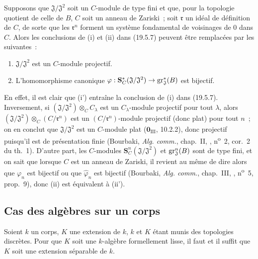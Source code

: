 \begin{remark}[19.5.8]
\label{0.19.5.8-fr}
Supposons que $\mathfrak J/\mathfrak J^2$ soit un $C$-module de type fini et
que, pour la topologie quotient de celle de $B$, $C$ soit un anneau de Zariski~;
soit $\mathfrak r$ un idéal de définition de $C$, de sorte que les
$\mathfrak r^n$ forment un système fondamental de voisinages de $0$ dans $C$.
Alors les conclusions de (i) et (ii) dans (19.5.7) peuvent être remplacées par
les suivantes~:
\begin{enumerate}
  \item[\rm(i')] $\mathfrak J/\mathfrak J^2$ est un $C$-module projectif.
  \item[\rm(ii')] L'homomorphisme canonique
  $\varphi:\mathbf S_C^*(\mathfrak J/\mathfrak J^2)
  \to\operatorname{gr}_{\mathfrak J}^*(B)$ est bijectif.
\end{enumerate}
En effet, il est clair que (i') entraîne la conclusion de (i) dans (19.5.7).
Inversement, si $(\mathfrak J/\mathfrak J^2)\otimes_C C_\lambda$ est un
$C_\lambda$-module projectif pour tout $\lambda$, alors
$(\mathfrak J/\mathfrak J^2)\otimes_C(C/\mathfrak r^n)$ est un
$(C/\mathfrak r^n)$-module projectif (donc plat) pour tout $n$~; on en conclut
que $\mathfrak J/\mathfrak J^2$ est un $C$-module plat
($\mathbf 0_{\mathrm{III}}$, 10.2.2), donc projectif puisqu'il est de
présentation finie (Bourbaki, \emph{Alg. comm.}, chap.~II, ,
n\textsuperscript{o}~2, cor.~2 du th.~1). D'autre part, les $C$-modules
$\mathbf S_C^n(\mathfrak J/\mathfrak J^2)$ et $\operatorname{gr}_{\mathfrak J}^n(B)$ sont
de type fini, et on sait que lorsque $C$ est un anneau de Zariski, il revient
au même de dire alors que $\varphi_n$ est bijectif ou que
$\widehat\varphi_n$ est bijectif (Bourbaki, \emph{Alg. comm.}, chap.~III,
, n\textsuperscript{o}~5, prop.~9), donc (ii) est équivalent à
(ii').
\end{remark}

\subsection{Cas des algèbres sur un corps}
\label{subsection:0.19.6-fr}

\begin{theorem}[19.6.1) (Cohen]
\label{0.19.6.1-fr}
Soient $k$ un corps, $K$ une extension de $k$, $k$ et $K$
étant munis des topologies discrètes. Pour que $K$ soit une $k$-algèbre
formellement lisse, il faut et il suffit que $K$ soit une extension séparable
de $k$.
\end{theorem}

